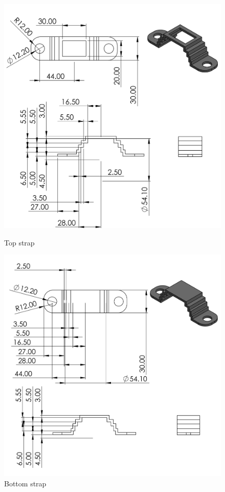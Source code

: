 \begin{enumerate}
\begin{enumerate}
    \begin{figure}[H]
        \centering
        \includegraphics[height=.45\textheight]{Figures/twoRailStrapsTop.PNG}
        \caption{Top strap}
        \includegraphics[height=.45\textheight]{Figures/twoRailStrapsBottom.PNG}
        \caption{Bottom strap}
        \label{fig:two_rail_serrated_straps}
    \end{figure}
      

\end{enumerate}
\end{enumerate}
